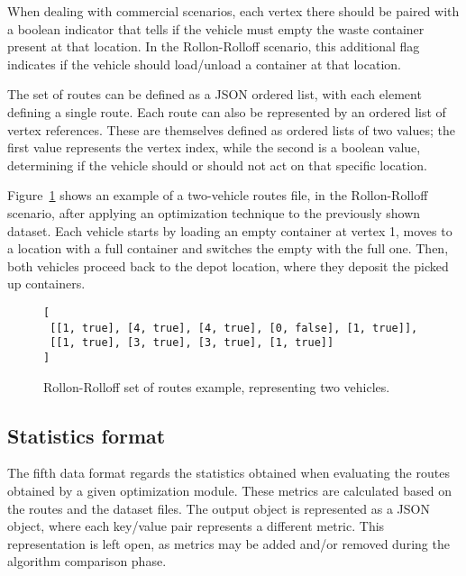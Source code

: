 When dealing with commercial scenarios, each vertex there should be paired with
a boolean indicator that tells if the vehicle must empty the waste container
present at that location. In the Rollon-Rolloff scenario, this additional
flag indicates if the vehicle should load/unload a container at that location.

The set of routes can be defined as a JSON ordered list, with each element
defining a single route. Each route can also be represented by an ordered list
of vertex references. These are themselves defined as ordered lists of two
values; the first value represents the vertex index, while the second is a
boolean value, determining if the vehicle should or should not act on that
specific location.

Figure~\ref{fig:routes-example-rr} shows an example of a two-vehicle routes
file, in the Rollon-Rolloff scenario, after applying an optimization technique
to the previously shown dataset. Each vehicle starts by loading an empty
container at vertex 1, moves to a location with a full container and switches
the empty with the full one. Then, both vehicles proceed back to the depot
location, where they deposit the picked up containers.

\begin{figure}[th]
  \begin{center}
    \leavevmode
      \begin{minipage}{14cm}
    \begin{verbatim}
[
 [[1, true], [4, true], [4, true], [0, false], [1, true]],
 [[1, true], [3, true], [3, true], [1, true]]
]
    \end{verbatim}
    \end{minipage}
    \caption{Rollon-Rolloff set of routes example, representing two vehicles.}
    \label{fig:routes-example-rr}
  \end{center}
\end{figure}




\subsection{Statistics format}
\label{section:statistics-format}

The fifth data format regards the statistics obtained when evaluating the
routes obtained by a given optimization module. These metrics are calculated
based on the routes and the dataset files. The output object is represented as
a JSON object, where each key/value pair represents a different metric. This
representation is left open, as metrics may be added and/or removed during the
algorithm comparison phase.









